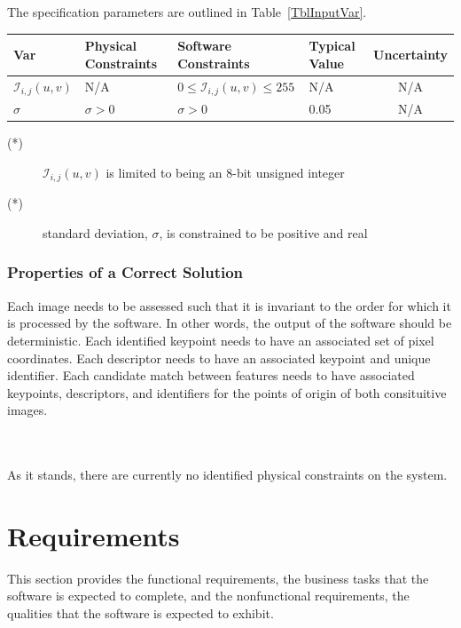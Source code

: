 \documentclass[12pt]{article}
\begin{document}
The specification parameters are outlined in Table~\ref{TblInputVar}.

\begin{table}[!h]
  \caption{Input Variables} \label{TblInputVar}
  \renewcommand{\arraystretch}{1.2}
\noindent \begin{longtable*}{l l l l c} 
  \toprule
  \textbf{Var} & \textbf{Physical Constraints} & \textbf{Software Constraints} &
                             \textbf{Typical Value} & \textbf{Uncertainty}\\
  \midrule 
  $\mathit{\mathcal{I}_{i, j}(u,v)}$ & N/A & $0 \leq \mathit{\mathcal{I}_{i, j}(u,v)} \leq 255$ 
  & N/A & N/A  %
  \\
  $\sigma$ & $\sigma > 0$ & $\sigma > 0 $ & 0.05 & N/A %
  \\
  \bottomrule
\end{longtable*}
\end{table}
\noindent 
\begin{description}
\item[(*)] $\mathit{\mathcal{I}_{i, j}(u,v)}$ is limited to being an 8-bit unsigned integer
\item[(*)] standard deviation, $\sigma$, is constrained to be positive and real
\end{description}

\subsubsection{Properties of a Correct Solution} \label{sec_CorrectSolution}

\noindent
Each image needs to be assessed such that it is invariant to the order for which it is processed by the software. In other words, the output of the \progname{} software should be deterministic. Each identified keypoint needs to have an associated set of pixel coordinates. Each descriptor needs to have an associated keypoint and unique identifier. Each candidate match between features needs to have associated keypoints, descriptors, and identifiers for the points of origin of both consituitive images.

\noindent
\\
\\
As it stands, there are currently no 
identified physical constraints on the system.


\section{Requirements}\label{Header_Req}
This section provides the functional requirements, the business tasks that the
software is expected to complete, and the nonfunctional requirements, the
qualities that the software is expected to exhibit.
\end{document}
